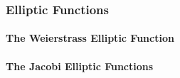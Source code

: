 





\subsubsection{Elliptic Functions}





\paragraph{The Weierstrass Elliptic Function}





\paragraph{The Jacobi Elliptic Functions}


